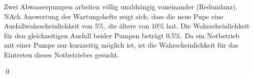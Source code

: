 \documentclass{abgabe}
\begin{document}
\begin{questions}
    \question
    Zwei Abwasserpumpen arbeiten völlig unabhängig voneinander (Redundanz). 
    NAch Auswertung der Wartungshefte zeigt sich, dass die neue Pupe eine Ausfallwahrscheinlichkeit von 5\%, die ältere von 10\% hat. 
    Die Wahrscheinlichkeit für den gleichzeitigen Ausfall beider Pumpen beträgt 0.5\%.
    Da ein Notbetrieb mit einer Pumpe nur kurzzeitig möglich ist, ist die Wahrscheinlichkeit für das Eintreten dieses Notbetriebes gesucht.
    \begin{solution}

        \qed
    \end{solution}
\end{questions}
\end{document}
